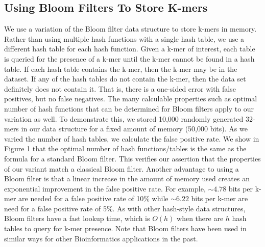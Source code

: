 \documentclass[12pt]{article} \usepackage{simplemargins}
\begin{document}
\subsection{Using Bloom Filters To Store K-mers}
We use a variation of the Bloom filter data structure to store k-mers
in memory. Rather than using multiple hash functions with a single
hash table, we use a different hash table for each hash
function. Given a k-mer of interest, each table is queried for the
presence of a k-mer until the k-mer cannot be found in a hash
table.
 If each hash table contains the k-mer, then the k-mer may
be in the dataset. If any of the hash tables do not contain the
k-mer, then the data set definitely does not contain it. That is, there is a one-sided
error with false positives, but no false negatives. The many
calculable properties such as optimal number of hash functions that
can be determined for Bloom filters apply to our variation as well. To
demonstrate this, we stored 10,000 randomly generated 32-mers in our
data structure for a fixed amount of memory (50,000 bits). As we
varied the number of hash tables, we calculate the false positive
rate. We show in Figure 1 that the optimal number of hash
functions/tables is the same as the formula for a standard Bloom
filter. This verifies our assertion that the properties of our 
variant match a classical Bloom filter. Another advantage to
using a Bloom filter is that a linear increase in the amount of memory
used creates an exponential improvement in the false positive
rate. For example, $\sim4.78$ bits per k-mer are needed for a false
positive rate of 10\% while $\sim6.22$ bits per k-mer are need for a false
positive rate of
5\%. As with other hash-style data structures, Bloom filters have a
fast lookup time, which is $O(h)$ when there are $h$ hash tables to query
for k-mer presence. Note that Bloom filters have been used in similar 
ways for other Bioinformatics applications in the 
past\cite{pmid20472541, haskell, pmid20426693}.
\end{document}
